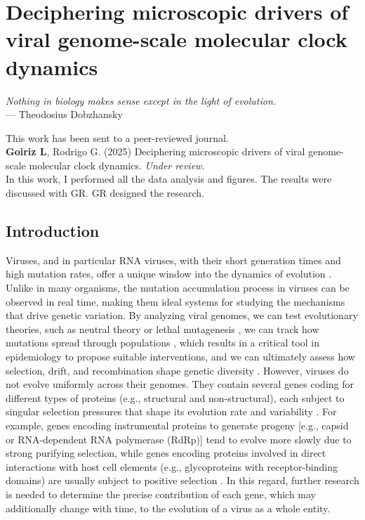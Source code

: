 \chapter{Deciphering microscopic drivers of viral genome-scale molecular clock dynamics}

\begin{flushright}
    \textit{Nothing in biology makes sense except in the light of evolution.}\\
    --- Theodosius Dobzhansky
\end{flushright}

\vspace{1cm}

\noindent This work has been sent to a peer-reviewed journal.\\

\noindent \textbf{Goiriz L}, Rodrigo G. (2025) {Deciphering microscopic drivers of viral genome-scale molecular clock dynamics}. \textit{Under review}.\\

\noindent In this work, I performed all the data analysis and figures. The results were discussed with GR. GR designed the research.

\vfill

\pagebreak

\sloppy

\section{Introduction}
Viruses, and in particular RNA viruses, with their short generation times and high mutation rates, offer a unique window into the dynamics of evolution \cite{elena2007virus}. Unlike in many organisms, the mutation accumulation process in viruses can be observed in real time, making them ideal systems for studying the mechanisms that drive genetic variation. By analyzing viral genomes, we can test evolutionary theories, such as neutral theory \cite{gojobori1990molecular} or lethal mutagenesis \cite{crotty2001rna}, we can track how mutations spread through populations \cite{kraemer2021spatiotemporal,viana2022rapid}, which results in a critical tool in epidemiology to propose suitable interventions, and we can ultimately assess how selection, drift, and recombination shape genetic diversity \cite{nelson2006stochastic,tully2009shifts}. However, viruses do not evolve uniformly across their genomes. They contain several genes coding for different types of proteins (e.g., structural and non-structural), each subject to singular selection pressures that shape its evolution rate and variability \cite{gray2011mode}. For example, genes encoding instrumental proteins to generate progeny [e.g., capsid or RNA-dependent RNA polymerase (RdRp)] tend to evolve more slowly due to strong purifying selection, while genes encoding proteins involved in direct interactions with host cell elements (e.g., glycoproteins with receptor-binding domains) are usually subject to positive selection \cite{kistler2022rapid}. In this regard, further research is needed to determine the precise contribution of each gene, which may additionally change with time, to the evolution of a virus as a whole entity.

